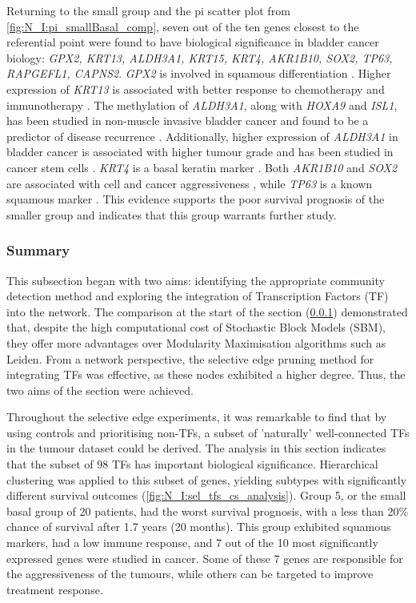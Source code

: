 Returning to the small group and the pi scatter plot from \cref{fig:N_I:pi_smallBasal_comp},
seven out of the ten genes closest to the referential point were found to have biological significance in bladder cancer biology: \textit{GPX2, KRT13, ALDH3A1, KRT15, KRT4, AKR1B10, SOX2, TP63, RAPGEFL1, CAPNS2}. \textit{GPX2} is involved in squamous differentiation \citet{Naiki2018-fp}. Higher expression of \textit{KRT13} is associated with better response to chemotherapy and immunotherapy \citet{Yu2023-db}. The methylation of \textit{ALDH3A1}, along with \textit{HOXA9} and \textit{ISL1}, has been studied in non-muscle invasive bladder cancer and found to be a predictor of disease recurrence \citet{McLean2023-qk}. Additionally, higher expression of \textit{ALDH3A1} in bladder cancer is associated with higher tumour grade and has been studied in cancer stem cells \citet{Kim2013-th}. \textit{KRT4} is a basal keratin marker \citet{Marzouka2018-ge}. Both \textit{AKR1B10} and \textit{SOX2} are associated with cell and cancer aggressiveness \citet{Huang2021-bn, Chiu2020-xh}, while \textit{TP63} is a known squamous marker \citet{Robertson2017-mg}. This evidence supports the poor survival prognosis of the smaller group and indicates that this group warrants further study.


\subsubsection{Summary}

This subsection began with two aims: identifying the appropriate community detection method and exploring the integration of Transcription Factors (TF) into the network. The comparison at the start of the section (\ref{}) demonstrated that, despite the high computational cost of Stochastic Block Models (SBM), they offer more advantages over Modularity Maximisation algorithms such as Leiden. From a network perspective, the selective edge pruning method for integrating TFs was effective, as these nodes exhibited a higher degree. Thus, the two aims of the section were achieved.

Throughout the selective edge experiments, it was remarkable to find that by using controls and prioritising non-TFs, a subset of 'naturally' well-connected TFs in the tumour dataset could be derived. The analysis in this section indicates that the subset of 98 TFs has important biological significance. Hierarchical clustering was applied to this subset of genes, yielding subtypes with significantly different survival outcomes (\cref{fig:N_I:sel_tfs_cs_analysis}). Group 5, or the small basal group of 20 patients, had the worst survival prognosis, with a less than 20\% chance of survival after 1.7 years (20 months). This group exhibited squamous markers, had a low immune response, and 7 out of the 10 most significantly expressed genes were studied in cancer. Some of these 7 genes are responsible for the aggressiveness of the tumours, while others can be targeted to improve treatment response.

